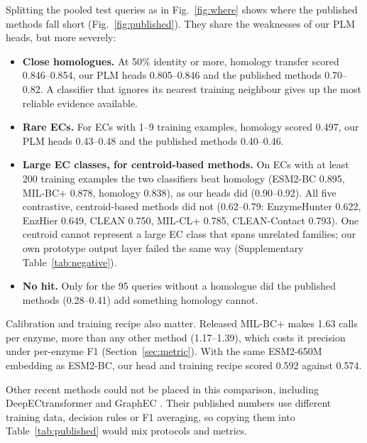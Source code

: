 \documentclass[11pt]{article}
\begin{document}
Splitting the pooled test queries as in Fig.~\ref{fig:where} shows where the published methods fall short
(Fig.~\ref{fig:published}). They share the weaknesses of our PLM heads, but more severely:
\begin{itemize}
  \item \textbf{Close homologues.} At 50\% identity or more, homology transfer scored 0.846--0.854, our PLM heads
        0.805--0.846 and the published methods 0.70--0.82. A classifier that ignores its nearest training neighbour gives
        up the most reliable evidence available.
  \item \textbf{Rare ECs.} For ECs with 1--9 training examples, homology scored 0.497, our PLM heads
        0.43--0.48 and the published methods 0.40--0.46.
  \item \textbf{Large EC classes, for centroid-based methods.} On ECs with at least 200 training examples the two
        classifiers beat homology (ESM2-BC 0.895, MIL-BC+ 0.878, homology 0.838), as our heads did (0.90--0.92). All five
        contrastive, centroid-based methods did not (0.62--0.79: EnzymeHunter 0.622, EnzHier 0.649, CLEAN 0.750,
        MIL-CL+ 0.785, CLEAN-Contact 0.793). One centroid cannot represent a large EC class that spans unrelated
        families; our own prototype output layer failed the same way (Supplementary Table~\ref{tab:negative}).
  \item \textbf{No hit.} Only for the 95 queries without a homologue did the published methods (0.28--0.41) add
        something homology cannot.
\end{itemize}
Calibration and training recipe also matter. Released MIL-BC+ makes 1.63 calls per enzyme, more than any other method
(1.17--1.39), which costs it precision under per-enzyme F1 (Section~\ref{sec:metric}). With the same ESM2-650M
embedding as ESM2-BC, our head and training recipe scored 0.592 against 0.574.

Other recent methods could not be placed in this comparison, including DeepECtransformer \cite{deepectransformer} and
GraphEC \cite{graphec}. Their published numbers use different training data, decision rules or F1 averaging, so copying
them into Table~\ref{tab:published} would mix protocols and metrics.
\end{document}
